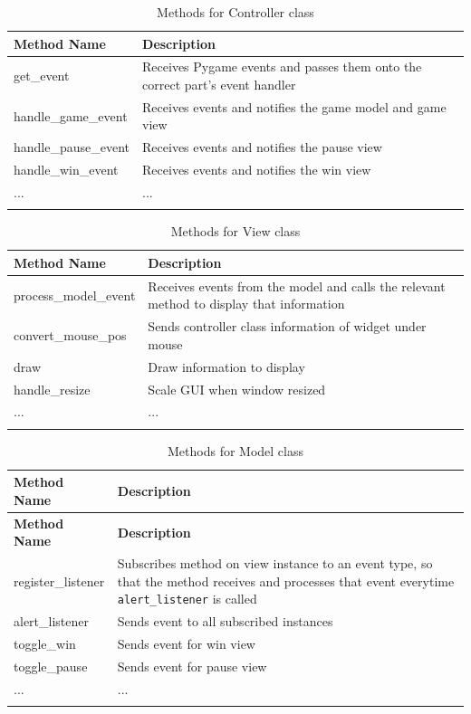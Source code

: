 \documentclass[../main/main.tex]{subfiles}
\begin{document}
\begin{longtable}[c]{l|p{}}
    \toprule
    \textbf{Method Name} & \textbf{Description}\\
    \midrule
    \endfirsthead
    \endhead

    get\_event & Receives Pygame events and passes them onto the correct part's event handler\\
    handle\_game\_event & Receives events and notifies the game model and game view\\
    handle\_pause\_event & Receives events and notifies the pause view\\
    handle\_win\_event & Receives events and notifies the win view\\
    ... & ...\\

    \bottomrule
    
\caption{Methods for Controller class}
\label{tab:controller-methods}
\end{longtable}

\begin{longtable}[c]{l|p{}}
    \toprule
    \textbf{Method Name} & \textbf{Description}\\
    \midrule
    \endfirsthead
    \endhead

    process\_model\_event & Receives events from the model and calls the relevant method to display that information\\
    convert\_mouse\_pos & Sends controller class information of widget under mouse\\
    draw & Draw information to display \\
    handle\_resize & Scale GUI when window resized\\
    ... & ...\\

    \bottomrule
    
\caption{Methods for View class}
\label{tab:view-methods}
\end{longtable}

\begin{longtable}[c]{l|p{}}
    \toprule
    \textbf{Method Name} & \textbf{Description}\\
    \midrule
    \endfirsthead
    \textbf{Method Name} & \textbf{Description}\\
    \midrule
    \endhead

    register\_listener & Subscribes method on view instance to an event type, so that the method receives and processes that event everytime \lstinline[language=Python]{alert_listener} is called\\
    alert\_listener & Sends event to all subscribed instances\\
    toggle\_win & Sends event for win view\\
    toggle\_pause & Sends event for pause view\\
    ... & ...\\

    \bottomrule
    
\caption{Methods for Model class}
\label{tab:model-methods}
\end{longtable}
\end{document}
